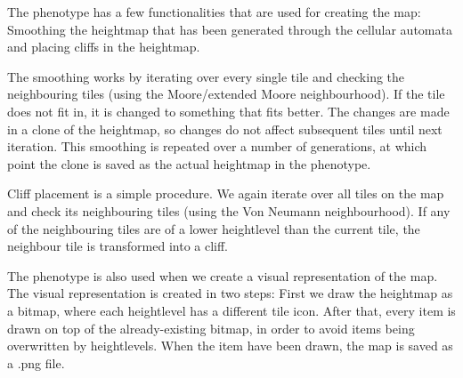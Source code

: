 The phenotype has a few functionalities that are used for creating the map: Smoothing the heightmap that has been generated through the cellular automata and placing cliffs in the heightmap. 

The smoothing works by iterating over every single tile and checking the neighbouring tiles (using the Moore/extended Moore neighbourhood). If the tile does not fit in, it is changed to something that fits better. The changes are made in a clone of the heightmap, so changes do not affect subsequent tiles until next iteration. This smoothing is repeated over a number of generations, at which point the clone is saved as the actual heightmap in the phenotype.

Cliff placement is a simple procedure. We again iterate over all tiles on the map and check its neighbouring tiles (using the Von Neumann neighbourhood). If any of the neighbouring tiles are of a lower heightlevel than the current tile, the neighbour tile is transformed into a cliff.

The phenotype is also used when we create a visual representation of the map. The visual representation is created in two steps: First we draw the heightmap as a bitmap, where each heightlevel has a different tile icon. After that, every item is drawn on top of the already-existing bitmap, in order to avoid items being overwritten by heightlevels. When the item have been drawn, the map is saved as a .png file.